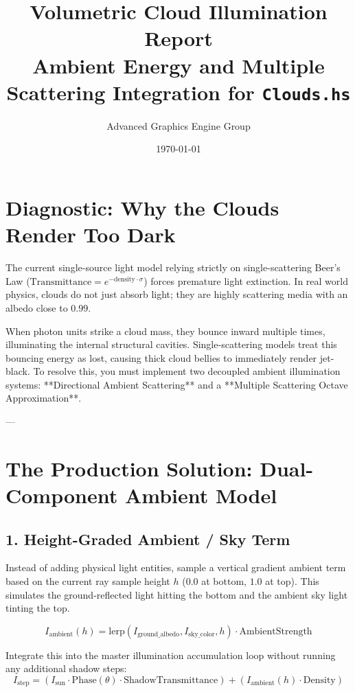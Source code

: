 \documentclass[11pt,a4paper]{article}
\title{Volumetric Cloud Illumination Report \\ \large Ambient Energy and Multiple Scattering Integration for \texttt{Clouds.hs}}
\author{Advanced Graphics Engine Group}
\date{\today}
\begin{document}
\maketitle

\section{Diagnostic: Why the Clouds Render Too Dark}
The current single-source light model relying strictly on single-scattering Beer's Law ($\text{Transmittance} = e^{-\text{density} \cdot \sigma}$) forces premature light extinction. In real world physics, clouds do not just absorb light; they are highly scattering media with an albedo close to $0.99$. 

When photon units strike a cloud mass, they bounce inward multiple times, illuminating the internal structural cavities. Single-scattering models treat this bouncing energy as lost, causing thick cloud bellies to immediately render jet-black. To resolve this, you must implement two decoupled ambient illumination systems: **Directional Ambient Scattering** and a **Multiple Scattering Octave Approximation**.

---

\section{The Production Solution: Dual-Component Ambient Model}

\subsection{1. Height-Graded Ambient / Sky Term}
Instead of adding physical light entities, sample a vertical gradient ambient term based on the current ray sample height $h$ ($0.0$ at bottom, $1.0$ at top). This simulates the ground-reflected light hitting the bottom and the ambient sky light tinting the top.

\begin{equation}
    I_{\text{ambient}}(h) = \text{lerp}(I_{\text{ground\_albedo}}, I_{\text{sky\_color}}, h) \cdot \text{AmbientStrength}
\end{equation}

Integrate this into the master illumination accumulation loop without running any additional shadow steps:
\begin{equation}
    I_{\text{step}} = (I_{\text{sun}} \cdot \text{Phase}(\theta) \cdot \text{ShadowTransmittance}) + (I_{\text{ambient}}(h) \cdot \text{Density})
\end{equation}
\end{document}
